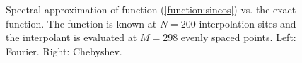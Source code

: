 \documentclass[12pt]{article}
\begin{document}
\begin{figure}[tbh]
   \centering
 \caption{Spectral approximation of function (\ref{function:sincos}) vs. the exact function.  The function is known at $N=200$ interpolation sites and the interpolant is evaluated at $M=298$ evenly spaced points. Left: Fourier.  Right: Chebyshev.
          } \label{fig:gibbsExample}
 \end{figure}
\end{document}
